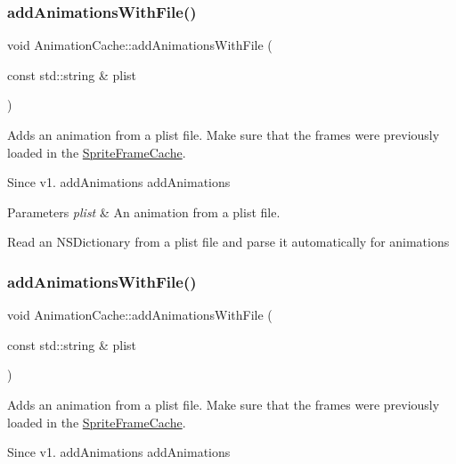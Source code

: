 \subsubsection{\texorpdfstring{add\+Animations\+With\+File()}{addAnimationsWithFile()}\hspace{0.1cm}{\footnotesize\ttfamily [1/2]}}
{\footnotesize\ttfamily void Animation\+Cache\+::add\+Animations\+With\+File (\begin{DoxyParamCaption}\item[{const std\+::string \&}]{plist }\end{DoxyParamCaption})}

Adds an animation from a plist file. Make sure that the frames were previously loaded in the \hyperlink{classSpriteFrameCache}{Sprite\+Frame\+Cache}. \begin{DoxySince}{Since}
v1.  add\+Animations  add\+Animations 
\end{DoxySince}

\begin{DoxyParams}{Parameters}
{\em plist} & An animation from a plist file.\\
\hline
\end{DoxyParams}
Read an N\+S\+Dictionary from a plist file and parse it automatically for animations \mbox{\label{classAnimationCache_a1b7464d9c2cd28731d099cb61aa46697}} 
\subsubsection{\texorpdfstring{add\+Animations\+With\+File()}{addAnimationsWithFile()}\hspace{0.1cm}{\footnotesize\ttfamily [2/2]}}
{\footnotesize\ttfamily void Animation\+Cache\+::add\+Animations\+With\+File (\begin{DoxyParamCaption}\item[{const std\+::string \&}]{plist }\end{DoxyParamCaption})}

Adds an animation from a plist file. Make sure that the frames were previously loaded in the \hyperlink{classSpriteFrameCache}{Sprite\+Frame\+Cache}. \begin{DoxySince}{Since}
v1.  add\+Animations  add\+Animations 
\end{DoxySince}

